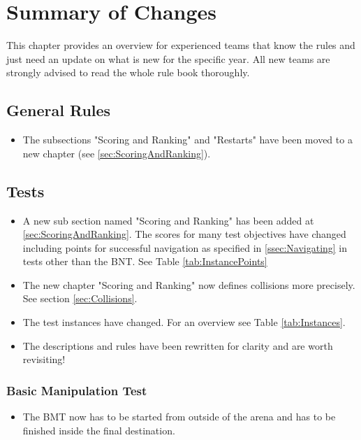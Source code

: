 
\chapter{Summary of Changes}

This chapter provides an overview for experienced teams that know the rules and just need an update on what is new for the specific year. All new teams are strongly advised to read the whole rule book thoroughly.

\section{General Rules}
\begin{itemize}
  \item The subsections "Scoring and Ranking" and "Restarts" have been moved to a new chapter (see \ref{sec:ScoringAndRanking}).
\end{itemize}

\section{Tests}
\begin{itemize}
  \item A new sub section named "Scoring and Ranking" has been added at \ref{sec:ScoringAndRanking}. The scores for many test objectives have changed including points for successful navigation as specified in \ref{ssec:Navigating} in tests other than the BNT. See Table \ref{tab:InstancePoints}
  \item The new chapter "Scoring and Ranking" now defines collisions more precisely. See section \ref{sec:Collisions}.
  \item The test instances have changed. For an overview see Table \ref{tab:Instances}.
  \item The descriptions and rules have been rewritten for clarity and are worth revisiting!
\end{itemize}

\subsection{Basic Manipulation Test} 
\begin{itemize}
  \item The BMT now has to be started from outside of the arena and has to be finished inside the final destination.
\end{itemize}

